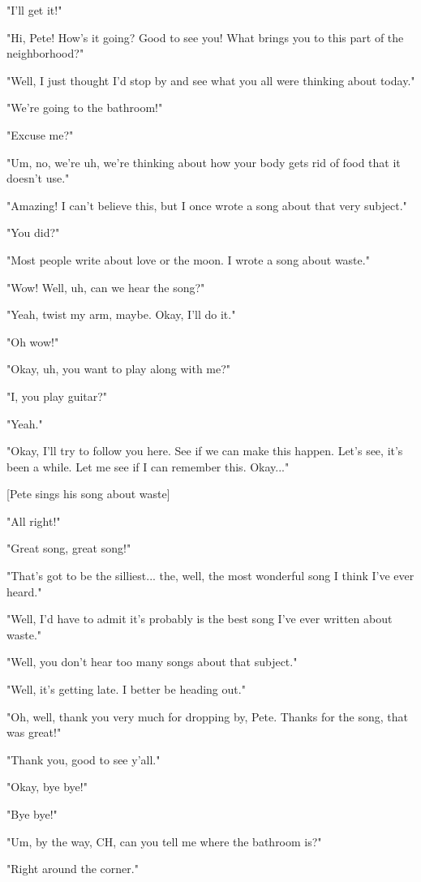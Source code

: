 "I'll get it!"

"Hi, Pete! How's it going? Good to see you! What brings you to this part of the neighborhood?"

"Well, I just thought I'd stop by and see what you all were thinking about today."

"We're going to the bathroom!"

"Excuse me?"

"Um, no, we're uh, we're thinking about how your body gets rid of food that it doesn't use."

"Amazing! I can't believe this, but I once wrote a song about that very subject."

"You did?"

"Most people write about love or the moon. I wrote a song about waste."

"Wow! Well, uh, can we hear the song?"

"Yeah, twist my arm, maybe. Okay, I'll do it."

"Oh wow!"

"Okay, uh, you want to play along with me?"

"I, you play guitar?"

"Yeah."

"Okay, I'll try to follow you here. See if we can make this happen. Let's see, it's been a while. Let me see if I can remember this. Okay..."

[Pete sings his song about waste]

"All right!"

"Great song, great song!"

"That's got to be the silliest... the, well, the most wonderful song I think I've ever heard."

"Well, I'd have to admit it's probably is the best song I've ever written about waste."

"Well, you don't hear too many songs about that subject."

"Well, it's getting late. I better be heading out."

"Oh, well, thank you very much for dropping by, Pete. Thanks for the song, that was great!"

"Thank you, good to see y'all."

"Okay, bye bye!"

"Bye bye!"

"Um, by the way, CH, can you tell me where the bathroom is?"

"Right around the corner."


